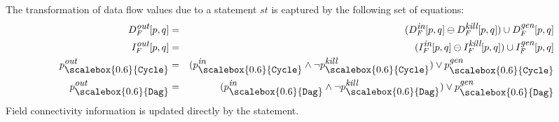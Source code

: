 \documentclass{sig-alternate}
\newcommand{\p}{\ensuremath{p}}
\newcommand{\q}{\ensuremath{q}}
\newcommand{\subC}{\mbox{\scalebox{0.6}{\Cycle}}}
\newcommand{\subD}{\mbox{\scalebox{0.6}{\Dag}}}
\newcommand{\dout}{\mbox{\footnotesize\em out}}
\newcommand{\din}{\mbox{\footnotesize\em in}}
\newcommand{\dkill}{\mbox{\footnotesize\em kill}}
\newcommand{\dgen}{\mbox{\footnotesize\em gen}}
\newcommand{\remOne}[2]{\ensuremath{#1 \ominus #2}}
\newcommand{\Dag}{{\tt Dag}}
\newcommand{\Cycle}{{\tt Cycle}}
\begin{document}
The transformation of data flow values due to a statement
$st$ is captured by the following set of equations:
\begin{eqnarray*}
  D_F^{\dout}[\p,\q] &=& (\remOne{D_F^{\din}[\p,\q]}{D_F^{\dkill}[\p,\q]}) \cup
  D_F^{\dgen}[\p,\q] \\
  I_F^{\dout}[\p,\q] &=& (\remOne{I_F^{\din}[\p,\q]}{I_F^{\dkill}[\p,\q]}) \cup
  I_F^{\dgen}[\p,\q] \\
  \p_{\subC}^{\dout} &=& (\p_{\subC}^{\din} \wedge
  \neg\p_{\subC}^{\dkill} ) \vee \p_{\subC}^{\dgen}  \\
  \p_{\subD}^{\dout} &=& (\p_{\subD}^{\din} \wedge
  \neg\p_{\subD}^{\dkill} ) \vee \p_{\subD}^{\dgen} 
\end{eqnarray*}
Field connectivity information is updated directly by the
statement. 

\end{document}
